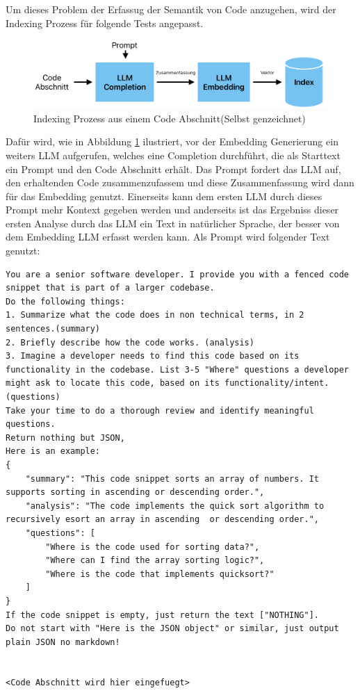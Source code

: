 \documentclass[../main.tex]{subfiles}
\begin{document}
Um dieses Problem der Erfassug der Semantik von Code anzugehen, wird der Indexing Prozess für folgende Tests angepasst.

\begin{figure}[ht]
    \centering
    \includegraphics[scale=.6]{"bilder/prozess.png"}
    \caption{Indexing Prozess aus einem Code Abschnitt(Selbst genzeichnet)}
    \label{fig:indexing}
\end{figure}
Dafür wird, wie in Abbildung \ref{fig:indexing} ilustriert, vor der Embedding Generierung ein weiters \gls{LLM} aufgerufen, welches eine Completion durchführt, die als Starttext ein Prompt und den Code Abschnitt erhält.
Das Prompt fordert das \gls{LLM} auf, den erhaltenden Code zusammenzufassem und diese Zusammenfassung wird dann für das Embedding genutzt.
Einerseits kann dem ersten \gls{LLM} durch dieses Prompt mehr Kontext gegeben werden und anderseits ist das Ergebniss dieser ersten Analyse durch das \gls{LLM} ein Text in natürlicher Sprache, der besser von dem Embedding \gls{LLM} erfasst werden kann.
Als Prompt wird folgender Text genutzt:

\begin{lstlisting}
You are a senior software developer. I provide you with a fenced code snippet that is part of a larger codebase.
Do the following things:
1. Summarize what the code does in non technical terms, in 2 sentences.(summary)
2. Briefly describe how the code works. (analysis)
3. Imagine a developer needs to find this code based on its functionality in the codebase. List 3-5 "Where" questions a developer might ask to locate this code, based on its functionality/intent. (questions)
Take your time to do a thorough review and identify meaningful questions.
Return nothing but JSON,
Here is an example:
{
    "summary": "This code snippet sorts an array of numbers. It supports sorting in ascending or descending order.", 
    "analysis": "The code implements the quick sort algorithm to recursively esort an array in ascending  or descending order.",
    "questions": [
        "Where is the code used for sorting data?",
        "Where can I find the array sorting logic?",
        "Where is the code that implements quicksort?"
    ]
}
If the code snippet is empty, just return the text ["NOTHING"].
Do not start with "Here is the JSON object" or similar, just output plain JSON no markdown!


<Code Abschnitt wird hier eingefuegt>
\end{lstlisting}
\end{document}
